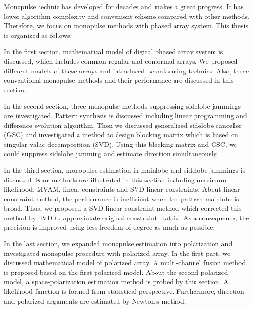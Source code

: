 \documentclass[master]{thesis-uestc}
\begin{document}
\begin{englishabstract}
Monopulse technic has developed for decades and makes a great progress.  
It has lower algorithm complexity and convenient scheme compared with other methods.  
Therefore, we focus on monopulse methods with phased array system.  
This thesis is organized as follows:

In the first section, mathematical model of digital phased array system is discussed, 
which includes common regular and conformal arrays.  We proposed different models of these arrays 
and introduced beamforming technics.  Also, three conventional monopulse methods and their performance 
are discussed in this section.

In the second section, three monopulse methods suppressing sidelobe jammings are investigated.    
Pattern synthesis is discussed including linear programming and difference evolution algorithm.  
Then we discussed generalized sidelobe canceller (GSC) and investigated a method to design blocking matrix 
which is based on singular value decomposition (SVD).  Using this blocking matrix and GSC, we could 
suppress sidelobe jamming and estimate direction simultaneously.

In the third section, monopulse estimation in mainlobe and sidelobe jammings is discussed.  
Four methods are illustrated in this section including maximum likelihood, MVAM, linear constraints
and SVD linear constraints.  
About linear constraint method, the performance is inefficient 
when the pattern mainlobe is broad. Thus, we proposed a SVD linear constraint method 
which corrected this method by SVD to approximate original constraint matrix.  
As a consequence, the precision is improved using less freedom-of-degree as much as possible.

In the last section, we expanded monopulse estimation into polarization and investigated monopulse procedure 
with polarized array.  In the first part, we discussed mathematical model of polarized array.  
A multi-channel fusion method is proposed based on the first polarized model.  
About the second polarized model, a space-polarization estimation method is probed by this section.  
A likelihood function is formed from statistical perspective.  
Furthermore, direction and polarized arguments are estimated by Newton's method.

\end{englishabstract}

\thesistableofcontents
\end{document}
